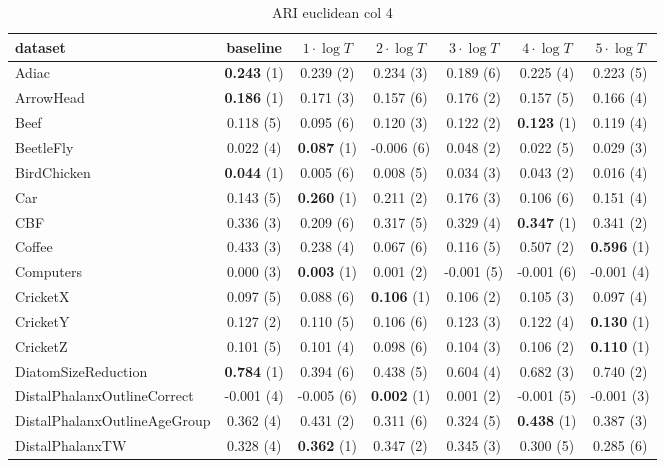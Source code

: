 \begin{table}[ht]
\caption{ARI euclidean col 4} 
\begin{adjustbox}{width=\textwidth}
\begin{tabular}{lcccccc}
\hline
dataset & baseline & \textbf{$1\cdot \log{T}$} & \textbf{$2\cdot \log{T}$} & \textbf{$3\cdot \log{T}$} & \textbf{$4\cdot \log{T}$} & \textbf{$5\cdot \log{T}$} \\ \hline
Adiac & \textbf{0.243} (1) & 0.239 (2) & 0.234 (3) & 0.189 (6) & 0.225 (4) & 0.223 (5) \\
ArrowHead & \textbf{0.186} (1) & 0.171 (3) & 0.157 (6) & 0.176 (2) & 0.157 (5) & 0.166 (4) \\
Beef & 0.118 (5) & 0.095 (6) & 0.120 (3) & 0.122 (2) & \textbf{0.123} (1) & 0.119 (4) \\
BeetleFly & 0.022 (4) & \textbf{0.087} (1) & -0.006 (6) & 0.048 (2) & 0.022 (5) & 0.029 (3) \\
BirdChicken & \textbf{0.044} (1) & 0.005 (6) & 0.008 (5) & 0.034 (3) & 0.043 (2) & 0.016 (4) \\
Car & 0.143 (5) & \textbf{0.260} (1) & 0.211 (2) & 0.176 (3) & 0.106 (6) & 0.151 (4) \\
CBF & 0.336 (3) & 0.209 (6) & 0.317 (5) & 0.329 (4) & \textbf{0.347} (1) & 0.341 (2) \\
Coffee & 0.433 (3) & 0.238 (4) & 0.067 (6) & 0.116 (5) & 0.507 (2) & \textbf{0.596} (1) \\
Computers & 0.000 (3) & \textbf{0.003} (1) & 0.001 (2) & -0.001 (5) & -0.001 (6) & -0.001 (4) \\
CricketX & 0.097 (5) & 0.088 (6) & \textbf{0.106} (1) & 0.106 (2) & 0.105 (3) & 0.097 (4) \\
CricketY & 0.127 (2) & 0.110 (5) & 0.106 (6) & 0.123 (3) & 0.122 (4) & \textbf{0.130} (1) \\
CricketZ & 0.101 (5) & 0.101 (4) & 0.098 (6) & 0.104 (3) & 0.106 (2) & \textbf{0.110} (1) \\
DiatomSizeReduction & \textbf{0.784} (1) & 0.394 (6) & 0.438 (5) & 0.604 (4) & 0.682 (3) & 0.740 (2) \\
DistalPhalanxOutlineCorrect & -0.001 (4) & -0.005 (6) & \textbf{0.002} (1) & 0.001 (2) & -0.001 (5) & -0.001 (3) \\
DistalPhalanxOutlineAgeGroup & 0.362 (4) & 0.431 (2) & 0.311 (6) & 0.324 (5) & \textbf{0.438} (1) & 0.387 (3) \\
DistalPhalanxTW & 0.328 (4) & \textbf{0.362} (1) & 0.347 (2) & 0.345 (3) & 0.300 (5) & 0.285 (6) \\

\end{tabular}
\end{adjustbox}
\end{table}
